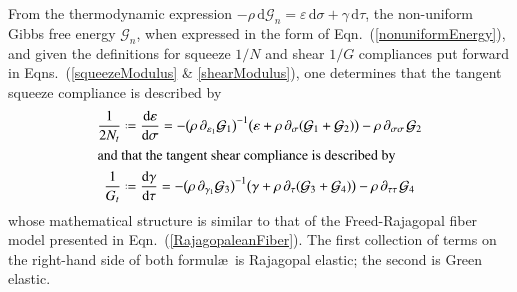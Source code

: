 From the thermo\-dynamic expression $-\rho \, \mathrm{d} \mathcal{G}_n = \varepsilon \, \mathrm{d} \sigma + \gamma \, \mathrm{d} \tau$, the non-uniform Gibbs free energy $\mathcal{G}_n$, when expressed in the form of Eqn.~(\ref{nonuniformEnergy}), and given the definitions for squeeze $1/N$ and shear $1/G$ compliances put forward in Eqns.~(\ref{squeezeModulus} \& \ref{shearModulus}), one determines that the tangent squeeze compliance is described by
\begin{subequations}
    \label{nonuniformCompliances}
    \begin{align}
    \frac{1}{2N_t} & \defeq \frac{\mathrm{d} \varepsilon}{\mathrm{d} \sigma} = - \bigl( \rho \, \partial_{\varepsilon_1} \mathcal{G}_1 \bigr)^{-1} \bigl( \varepsilon + \rho \, \partial_{\sigma} ( \mathcal{G}_1 + \mathcal{G}_2 ) \bigr) - \rho \, \partial_{\sigma\sigma\,} \mathcal{G}_2
    \label{squeezeCompliance} \\
    \intertext{and that the tangent shear compliance is described by}
    \frac{1}{G_t} & \defeq \frac{\mathrm{d} \gamma}{\mathrm{d} \tau} = - \bigl( \rho \, \partial_{\gamma_1} \mathcal{G}_3 \bigr)^{-1} \bigl( \gamma + \rho \, \partial_{\tau} ( \mathcal{G}_3 + \mathcal{G}_4 ) \bigr) - \rho \, \partial_{\tau\tau\,} \mathcal{G}_4
    \label{shearCompliance}
    \end{align}
\end{subequations}
whose mathematical structure is similar to that of the Freed-Rajagopal fiber model presented in Eqn.~(\ref{RajagopaleanFiber}).  The first collection of terms on the right-hand side of both formul\ae\ is Rajagopal elastic; the second is Green elastic.  

